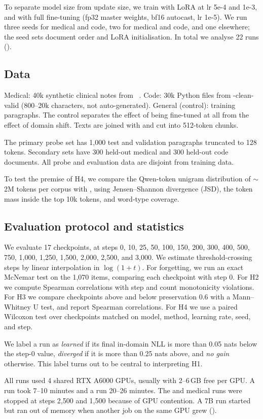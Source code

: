  To separate model size from update size, we train \qwenS with LoRA at lr 5e-4 and 1e-3, and \pythiaS with full fine-tuning (fp32 master weights, bf16 autocast, lr 1e-5). We run three seeds for \qwenS medical and code, two for \pythiaS medical and code, and one elsewhere; the seed sets document order and LoRA initialisation. In total we analyse 22 runs ().

\subsection{Data}

 Medical: 40k synthetic clinical notes from \asclepius~\citep{kweon2024publicly}. Code: 30k Python files from \codeparrot-clean-valid (800--20k characters, not auto-generated). General (control): \wikitext training paragraphs. The control separates the effect of being fine-tuned at all from the effect of domain shift. Texts are joined with \eos and cut into 512-token chunks.

 The primary probe set has 1,000 \wikitext test and validation paragraphs truncated to 128 tokens. Secondary sets have 300 held-out medical and 300 held-out code documents. All probe and evaluation data are disjoint from training data.

 To test the premise of H4, we compare the Qwen-token unigram distribution of $\sim$2M tokens per corpus with \wikitext, using Jensen--Shannon divergence (JSD), the token mass inside the top 10k \wikitext tokens, and word-type coverage.

\subsection{Evaluation protocol and statistics}

We evaluate 17 checkpoints, at steps 0, 10, 25, 50, 100, 150, 200, 300, 400, 500, 750, 1,000, 1,250, 1,500, 2,000, 2,500, and 3,000. We estimate threshold-crossing steps by linear interpolation in $\log(1+t)$. For forgetting, we run an exact McNemar test on the 1,070 items, comparing each checkpoint with step 0. For H2 we compute Spearman correlations with step and count monotonicity violations. For H3 we compare checkpoints above and below preservation 0.6 with a Mann--Whitney U test, and report Spearman correlations. For H4 we use a paired Wilcoxon test over checkpoints matched on model, method, learning rate, seed, and step.

 We label a run as \emph{learned} if its final in-domain NLL is more than 0.05 nats below the step-0 value, \emph{diverged} if it is more than 0.25 nats above, and \emph{no gain} otherwise. This label turns out to be central to interpreting H1.

 All runs used 4 shared RTX A6000 GPUs, usually with 2--6\,GB free per GPU. A \pythiaS run took 7--10 minutes and a \qwenS run 20--26 minutes. The \qwenM and \qwenL medical runs were stopped at steps 2,500 and 1,500 because of GPU contention. A 7B run started but ran out of memory when another job on the same GPU grew ().
